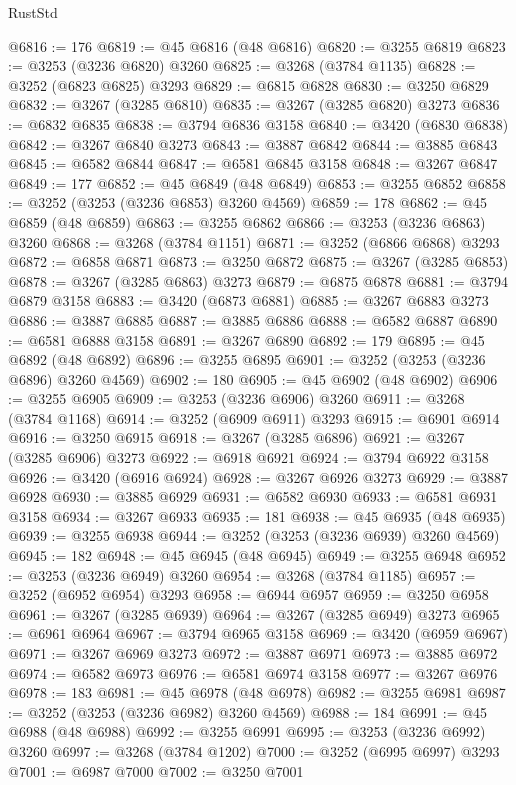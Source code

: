 \begin{lexlean}{RustStd}
\begin{coremodule}
@6816 := 176
@6819 := @45 @6816 (@48 @6816)
@6820 := @3255 @6819
@6823 := @3253 (@3236 @6820) @3260
@6825 := @3268 (@3784 @1135)
@6828 := @3252 (@6823 @6825) @3293
@6829 := @6815 @6828
@6830 := @3250 @6829
@6832 := @3267 (@3285 @6810)
@6835 := @3267 (@3285 @6820) @3273
@6836 := @6832 @6835
@6838 := @3794 @6836 @3158
@6840 := @3420 (@6830 @6838)
@6842 := @3267 @6840 @3273
@6843 := @3887 @6842
@6844 := @3885 @6843
@6845 := @6582 @6844
@6847 := @6581 @6845 @3158
@6848 := @3267 @6847
@6849 := 177
@6852 := @45 @6849 (@48 @6849)
@6853 := @3255 @6852
@6858 := @3252 (@3253 (@3236 @6853) @3260 @4569)
@6859 := 178
@6862 := @45 @6859 (@48 @6859)
@6863 := @3255 @6862
@6866 := @3253 (@3236 @6863) @3260
@6868 := @3268 (@3784 @1151)
@6871 := @3252 (@6866 @6868) @3293
@6872 := @6858 @6871
@6873 := @3250 @6872
@6875 := @3267 (@3285 @6853)
@6878 := @3267 (@3285 @6863) @3273
@6879 := @6875 @6878
@6881 := @3794 @6879 @3158
@6883 := @3420 (@6873 @6881)
@6885 := @3267 @6883 @3273
@6886 := @3887 @6885
@6887 := @3885 @6886
@6888 := @6582 @6887
@6890 := @6581 @6888 @3158
@6891 := @3267 @6890
@6892 := 179
@6895 := @45 @6892 (@48 @6892)
@6896 := @3255 @6895
@6901 := @3252 (@3253 (@3236 @6896) @3260 @4569)
@6902 := 180
@6905 := @45 @6902 (@48 @6902)
@6906 := @3255 @6905
@6909 := @3253 (@3236 @6906) @3260
@6911 := @3268 (@3784 @1168)
@6914 := @3252 (@6909 @6911) @3293
@6915 := @6901 @6914
@6916 := @3250 @6915
@6918 := @3267 (@3285 @6896)
@6921 := @3267 (@3285 @6906) @3273
@6922 := @6918 @6921
@6924 := @3794 @6922 @3158
@6926 := @3420 (@6916 @6924)
@6928 := @3267 @6926 @3273
@6929 := @3887 @6928
@6930 := @3885 @6929
@6931 := @6582 @6930
@6933 := @6581 @6931 @3158
@6934 := @3267 @6933
@6935 := 181
@6938 := @45 @6935 (@48 @6935)
@6939 := @3255 @6938
@6944 := @3252 (@3253 (@3236 @6939) @3260 @4569)
@6945 := 182
@6948 := @45 @6945 (@48 @6945)
@6949 := @3255 @6948
@6952 := @3253 (@3236 @6949) @3260
@6954 := @3268 (@3784 @1185)
@6957 := @3252 (@6952 @6954) @3293
@6958 := @6944 @6957
@6959 := @3250 @6958
@6961 := @3267 (@3285 @6939)
@6964 := @3267 (@3285 @6949) @3273
@6965 := @6961 @6964
@6967 := @3794 @6965 @3158
@6969 := @3420 (@6959 @6967)
@6971 := @3267 @6969 @3273
@6972 := @3887 @6971
@6973 := @3885 @6972
@6974 := @6582 @6973
@6976 := @6581 @6974 @3158
@6977 := @3267 @6976
@6978 := 183
@6981 := @45 @6978 (@48 @6978)
@6982 := @3255 @6981
@6987 := @3252 (@3253 (@3236 @6982) @3260 @4569)
@6988 := 184
@6991 := @45 @6988 (@48 @6988)
@6992 := @3255 @6991
@6995 := @3253 (@3236 @6992) @3260
@6997 := @3268 (@3784 @1202)
@7000 := @3252 (@6995 @6997) @3293
@7001 := @6987 @7000
@7002 := @3250 @7001

\end{coremodule}
\end{lexlean}
